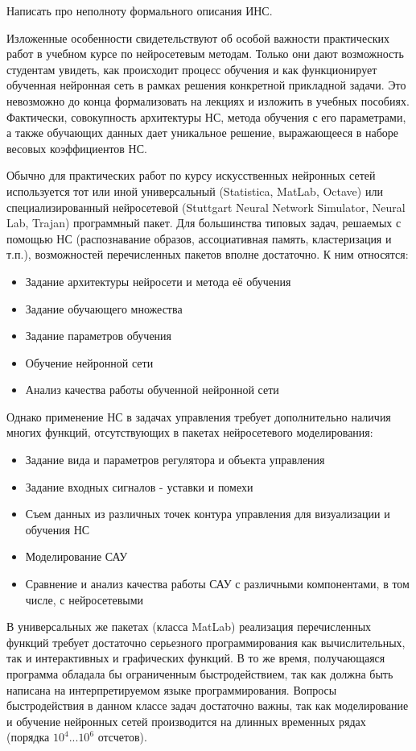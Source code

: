 Написать про неполноту формального описания ИНС.

Изложенные особенности свидетельствуют об особой важности практических
работ в учебном курсе по нейросетевым методам.  Только они дают
возможность студентам увидеть, как происходит процесс обучения и как
функционирует обученная нейронная сеть в рамках решения конкретной
прикладной задачи.  Это невозможно до конца формализовать на лекциях и
изложить в учебных пособиях.  Фактически, совокупность архитектуры НС,
метода обучения с его параметрами, а также обучающих данных дает
уникальное решение, выражающееся в наборе весовых коэффициентов НС.

Обычно для практических работ по курсу искусственных нейронных сетей
используется тот или иной универсальный (Statistica, MatLab, Octave)
или специализированный нейросетевой (Stuttgart Neural Network
Simulator, Neural Lab, Trajan) программный пакет.  Для большинства
типовых задач, решаемых с помощью НС (распознавание образов,
ассоциативная память, кластеризация и т.п.), возможностей
перечисленных пакетов вполне достаточно.  К ним относятся:

\begin{itemize}
\item Задание архитектуры нейросети и метода её обучения
\item Задание обучающего множества
\item Задание параметров обучения
\item Обучение нейронной сети
\item Анализ качества работы обученной нейронной сети
\end{itemize}

Однако применение НС в задачах управления требует дополнительно
наличия многих функций, отсутствующих в пакетах нейросетевого
моделирования:

\begin{itemize}
\item Задание вида и параметров регулятора и объекта управления
\item Задание входных сигналов - уставки и помехи
\item Съем данных из различных точек контура управления для
  визуализации и обучения НС
\item Моделирование САУ
\item Сравнение и анализ качества работы САУ с различными
  компонентами, в том числе, с нейросетевыми
\end{itemize}

В универсальных же пакетах (класса MatLab) реализация перечисленных
функций требует достаточно серьезного программирования как
вычислительных, так и интерактивных и графических функций.  В то же
время, получающаяся программа обладала бы ограниченным
быстродействием, так как должна быть написана на интерпретируемом
языке программирования.  Вопросы быстродействия в данном классе задач
достаточно важны, так как моделирование и обучение нейронных сетей
производится на длинных временных рядах (порядка $10^4 ... 10^6$
отсчетов).

